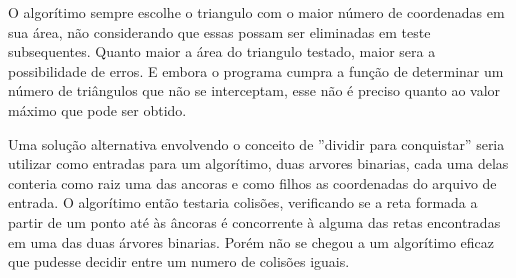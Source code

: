 \documentclass[12pt,a4paper]{article}
\begin{document}
O algorítimo sempre escolhe o triangulo com o maior número de coordenadas em sua área, não considerando que essas possam ser eliminadas em teste subsequentes. Quanto maior a área do triangulo testado, maior sera a possibilidade de erros. E embora o programa cumpra a função de determinar um número de triângulos que não se interceptam, esse não é preciso quanto ao valor máximo que pode ser obtido.

Uma solução alternativa envolvendo o conceito de ''dividir para conquistar'' seria utilizar como entradas para um algorítimo, duas arvores binarias, cada uma delas conteria como raiz uma das ancoras e como filhos as coordenadas do arquivo de entrada. O algorítimo então testaria colisões, verificando se a reta formada a partir de um ponto até às âncoras é concorrente à alguma das retas encontradas em uma das duas árvores binarias. Porém não se chegou a um algorítimo eficaz que pudesse decidir entre um numero de colisões iguais.

\pagebreak

\begin{flushleft}
	\nocite{*}
	
\end{flushleft}
\end{document}
